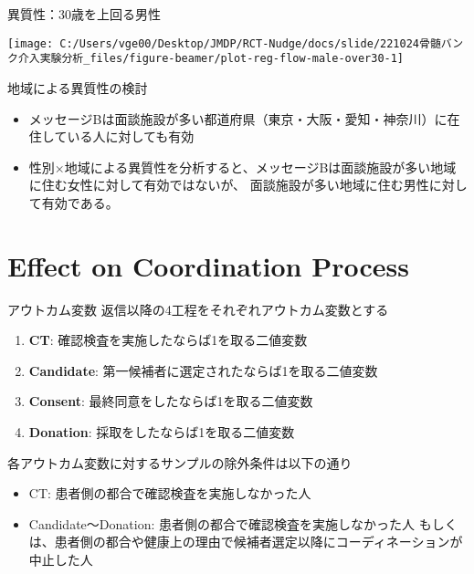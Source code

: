 \documentclass[
      aspectratio=169,
        12pt,
    ]{beamer}
\renewcommand{\textbf}[1]{{\color{DarkBlue}\bfseries#1}}
\providecommand{\tightlist}{%
  \setlength{\itemsep}{0pt}\setlength{\parskip}{0pt}}
\begin{document}
\begin{frame}{異質性：30歳を上回る男性}
\protect\hypertarget{ux7570ux8ceaux602730ux6b73ux3092ux4e0aux56deux308bux7537ux6027}{}
\begin{center}\texttt{[image: C:/Users/vge00/Desktop/JMDP/RCT-Nudge/docs/slide/221024骨髄バンク介入実験分析\_files/figure-beamer/plot-reg-flow-male-over30-1]} \end{center}
\end{frame}

\begin{frame}{地域による異質性の検討}
\protect\hypertarget{ux5730ux57dfux306bux3088ux308bux7570ux8ceaux6027ux306eux691cux8a0e}{}
\begin{itemize}
\tightlist
\item
  メッセージBは面談施設が多い都道府県（東京・大阪・愛知・神奈川）に在住している人に対しても有効
\item
  性別×地域による異質性を分析すると、メッセージBは面談施設が多い地域に住む女性に対して有効ではないが、
  面談施設が多い地域に住む男性に対して有効である。
\end{itemize}
\end{frame}

\hypertarget{effect-on-coordination-process}{%
\section{Effect on Coordination Process}\label{effect-on-coordination-process}}

\begin{frame}{アウトカム変数}
\protect\hypertarget{ux30a2ux30a6ux30c8ux30abux30e0ux5909ux6570-1}{}
返信以降の4工程をそれぞれアウトカム変数とする

\begin{enumerate}
\tightlist
\item
  \textbf{CT}: 確認検査を実施したならば1を取る二値変数
\item
  \textbf{Candidate}: 第一候補者に選定されたならば1を取る二値変数
\item
  \textbf{Consent}: 最終同意をしたならば1を取る二値変数
\item
  \textbf{Donation}: 採取をしたならば1を取る二値変数
\end{enumerate}

各アウトカム変数に対するサンプルの除外条件は以下の通り

\begin{itemize}
\tightlist
\item
  CT: 患者側の都合で確認検査を実施しなかった人
\item
  Candidate～Donation: 患者側の都合で確認検査を実施しなかった人
  もしくは、患者側の都合や健康上の理由で候補者選定以降にコーディネーションが中止した人
\end{itemize}
\end{frame}
\end{document}
